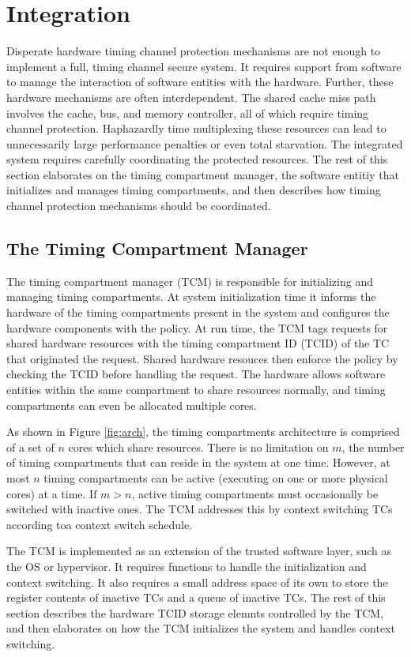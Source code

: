 \section{Integration}
Disperate hardware timing channel protection mechanisms are not enough to 
implement a full, timing channel secure system. It requires support from 
software to manage the interaction of software entities with the hardware.  
Further, these hardware mechanisms are often interdependent. The shared cache 
miss path involves the cache, bus, and memory controller, all of which require 
timing channel protection. Haphazardly time multiplexing these resources can 
lead to unnecessarily large performance penalties or even total starvation. The 
integrated system requires carefully coordinating the protected resources. The 
rest of this section elaborates on the timing compartment manager, the software 
entitiy that initializes and manages timing compartments, and then describes 
how timing channel protection mechanisms should be coordinated.

\subsection{The Timing Compartment Manager}
\label{sec:integration_tcm}
The timing compartment manager (TCM) is responsible for initializing and 
managing timing compartments. At system initialization time it informs the 
hardware of the timing compartments present in the system and configures the 
hardware components with the policy. At run time, the TCM tags requests for 
shared hardware resources with the timing compartment ID (TCID) of the TC that 
originated the request. Shared hardware resouces then enforce the policy by 
checking the TCID before handling the request. The hardware allows software 
entities within the same compartment to share resources normally, and timing 
compartments can even be allocated multiple cores.

As shown in Figure \ref{fig:arch}, the timing compartments architecture is 
comprised of a set of $n$ cores which share resources. There is no limitation 
on $m$, the number of timing compartments that can reside in the system at one 
time. However, at most $n$ timing compartments can be active (executing on one 
or more physical cores) at a time. If $m>n$, active timing compartments must 
occasionally be switched with inactive ones. The TCM addresses this by context 
switching TCs according toa context switch schedule.

The TCM is implemented as an extension of the trusted software layer, such as 
the OS or hypervisor. It requires functions to handle the initialization
and context switching. It also requires a small address space of its 
own to store the register contents of inactive TCs and a queue of inactive TCs.
The rest of this section describes the hardware TCID storage elemnts controlled 
by the TCM, and then elaborates on how the TCM initializes the system and 
handles context switching.

